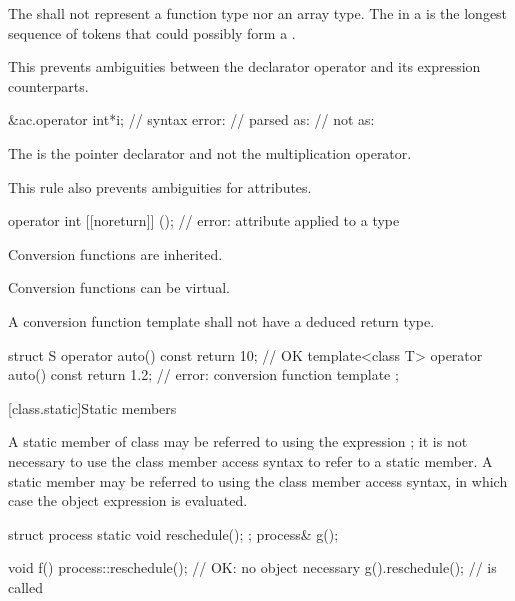 \pnum
The
shall not represent a function type nor an array type.
The
in a
is the longest sequence of
tokens that could possibly form a .
\begin{note}
This prevents ambiguities between the declarator operator \tcode{*} and its expression
counterparts.
\begin{example}
\begin{codeblock}
&ac.operator int*i; // syntax error:
                    // parsed as: 
                    // not as: 
\end{codeblock}
The \tcode{*} is the pointer declarator and not the multiplication operator.
\end{example}
This rule also prevents ambiguities for attributes.
\begin{example}
\begin{codeblock}
operator int [[noreturn]] ();   // error:  attribute applied to a type
\end{codeblock}
\end{example}
\end{note}

\pnum
{}%
Conversion functions are inherited.

\pnum
{}%
Conversion functions can be virtual.

\pnum
{}%
A conversion function template shall not have a
deduced return type.
\begin{example}
\begin{codeblock}
struct S {
  operator auto() const { return 10; }      // OK
  template<class T>
  operator auto() const { return 1.2; }     // error: conversion function template
};
\end{codeblock}
\end{example}

[class.static]{Static members}%
%

\pnum
A static member  of class  may be referred to
using the  expression ; it is not
necessary to use the class member access syntax to
refer to a static member. A static member may be
referred to using the class member access syntax, in which case the
object expression is evaluated.
\begin{example}
\begin{codeblock}
struct process {
  static void reschedule();
};
process& g();

void f() {
  process::reschedule();        // OK: no object necessary
  g().reschedule();             //  is called
}
\end{codeblock}
\end{example}

